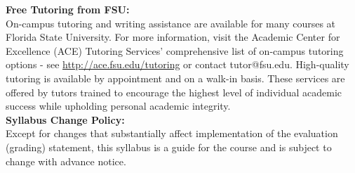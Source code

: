 \documentclass[11pt]{article}
\begin{document}
\textbf{\large Free Tutoring from FSU:}\\
On-campus tutoring and writing assistance are available for many courses at Florida State University. For more
information, visit the Academic Center for Excellence (ACE) Tutoring Services’ comprehensive list of on-campus
tutoring options - see \url{http://ace.fsu.edu/tutoring} or contact tutor@fsu.edu. High-quality tutoring is
available by appointment and on a walk-in basis. These services are offered by tutors trained to encourage the
highest level of individual academic success while upholding personal academic integrity.\\

\textbf{\large Syllabus Change Policy:}\\
Except for changes that substantially affect implementation of the evaluation (grading) statement, this syllabus
is a guide for the course and is subject to change with advance notice.
\end{document}
